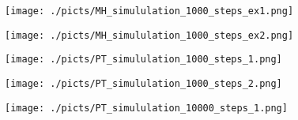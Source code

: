\begin{frame}[plain]

	\begin{center}
		\begin{figure}\texttt{[image: ./picts/MH\_simululation\_1000\_steps\_ex1.png]}\end{figure}	
	\end{center}	
		
\end{frame}

\begin{frame}[plain]

	\begin{center}
		\begin{figure}\texttt{[image: ./picts/MH\_simululation\_1000\_steps\_ex2.png]}\end{figure}	
	\end{center}	
		
\end{frame}



\begin{frame}[plain]

	\begin{center}
		\begin{figure}\texttt{[image: ./picts/PT\_simululation\_1000\_steps\_1.png]}\end{figure}	
	\end{center}	
		
\end{frame}

\begin{frame}[plain]

	\begin{center}
		\begin{figure}\texttt{[image: ./picts/PT\_simululation\_1000\_steps\_2.png]}\end{figure}	
	\end{center}	
		
\end{frame}

\begin{frame}[plain]

	\begin{center}
		\begin{figure}\texttt{[image: ./picts/PT\_simululation\_10000\_steps\_1.png]}\end{figure}	
	\end{center}	
		
\end{frame}
